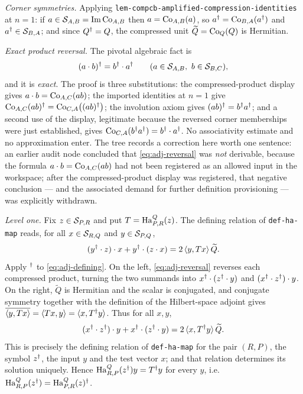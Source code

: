 \emph{Corner symmetries.} Applying
\texttt{lem-compcb-amplified-compression-identities} at $n=1$: if
$a\in\mathcal S_{A,B}=\operatorname{Im}\mathrm{Co}_{A,B}$ then $a=\mathrm{Co}_{A,B}(a)$, so
$a^{\dagger}=\mathrm{Co}_{B,A}(a^{\dagger})$ and $a^{\dagger}\in\mathcal S_{B,A}$; and since $Q^{\dagger}=Q$, the compressed unit
$\widetilde Q=\mathrm{Co}_{Q}(Q)$ is Hermitian.

\emph{Exact product reversal.} The pivotal algebraic fact is
\begin{equation}\label{eq:adj-reversal}
  (a\mathbin{\cdot} b)^{\dagger}=b^{\dagger}\mathbin{\cdot} a^{\dagger}
  \qquad (a\in\mathcal S_{A,B},\ b\in\mathcal S_{B,C}),
\end{equation}
and it is \emph{exact}. The proof is three substitutions: the compressed-product display
gives $a\mathbin{\cdot} b=\mathrm{Co}_{A,C}(ab)$; the imported identities at $n=1$ give
$\mathrm{Co}_{A,C}(ab)^{\dagger}=\mathrm{Co}_{C,A}\bigl((ab)^{\dagger}\bigr)$; the involution axiom gives
$(ab)^{\dagger}=b^{\dagger} a^{\dagger}$; and a second use of the display, legitimate because the reversed
corner memberships were just established, gives
$\mathrm{Co}_{C,A}(b^{\dagger} a^{\dagger})=b^{\dagger}\mathbin{\cdot} a^{\dagger}$. No associativity estimate and no approximation
enter. The tree records a correction here worth one sentence: an earlier audit node
concluded that \eqref{eq:adj-reversal} was \emph{not} derivable, because the formula
$a\mathbin{\cdot} b=\mathrm{Co}_{A,C}(ab)$ had not been registered as an allowed input in the workspace;
after the compressed-product display was registered, that negative conclusion --- and the
associated demand for further definition provisioning --- was explicitly withdrawn.

\emph{Level one.} Fix $z\in\mathcal S_{P,R}$ and put $T=\mathrm{Ha}^{Q}_{P,R}(z)$. The defining relation
of \texttt{def-ha-map} reads, for all $x\in\mathcal S_{R,Q}$ and $y\in\mathcal S_{P,Q}$,
\begin{equation}\label{eq:adj-defining}
  (y^{\dagger}\mathbin{\cdot} z)\mathbin{\cdot} x+y^{\dagger}\mathbin{\cdot}(z\mathbin{\cdot} x)=2\,\langle y,Tx\rangle\,\widetilde Q .
\end{equation}
Apply $^{\dagger}$ to \eqref{eq:adj-defining}. On the left, \eqref{eq:adj-reversal} reverses each
compressed product, turning the two summands into
$x^{\dagger}\mathbin{\cdot}(z^{\dagger}\mathbin{\cdot} y)$ and $(x^{\dagger}\mathbin{\cdot} z^{\dagger})\mathbin{\cdot} y$. On the right, $\widetilde Q$ is
Hermitian and the scalar is conjugated, and conjugate symmetry together with the
definition of the Hilbert-space adjoint gives
$\overline{\langle y,Tx\rangle}=\langle Tx,y\rangle=\langle x,T^{\dagger} y\rangle$. Thus for all $x,y$,
\[
  (x^{\dagger}\mathbin{\cdot} z^{\dagger})\mathbin{\cdot} y+x^{\dagger}\mathbin{\cdot}(z^{\dagger}\mathbin{\cdot} y)=2\,\langle x,T^{\dagger} y\rangle\,\widetilde Q .
\]
This is precisely the defining relation of \texttt{def-ha-map} for the pair $(R,P)$, the
symbol $z^{\dagger}$, the input $y$ and the test vector $x$; and that relation determines its
solution uniquely. Hence $\mathrm{Ha}^{Q}_{R,P}(z^{\dagger})y=T^{\dagger} y$ for every $y$, i.e.
$\mathrm{Ha}^{Q}_{R,P}(z^{\dagger})=\mathrm{Ha}^{Q}_{P,R}(z)^{\dagger}$.

